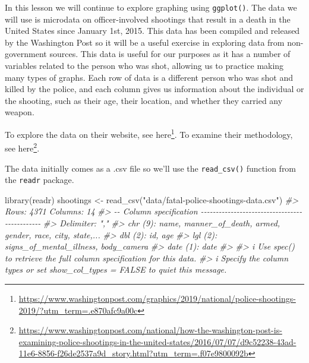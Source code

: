 \documentclass[
]{krantz}
\makeatletter
\newenvironment{Shaded}{\begin{snugshade}}{\end{snugshade}}
\newcommand{\CommentTok}[1]{\textcolor[rgb]{0.37,0.37,0.37}{\textit{#1}}}
\newcommand{\FunctionTok}[1]{\textcolor[rgb]{0,0,0}{#1}}
\newcommand{\NormalTok}[1]{#1}
\newcommand{\OtherTok}[1]{\textcolor[rgb]{0.37,0.37,0.37}{#1}}
\newcommand{\StringTok}[1]{\textcolor[rgb]{0.5,0.5,0.5}{#1}}
\renewcommand{\href}[2]{#2\footnote{\url{#1}}}
\newenvironment{kframe}{%
\medskip{}
\setlength{\fboxsep}{.8em}
 \def\at@end@of@kframe{}%
 \ifinner\ifhmode%
  \def\at@end@of@kframe{\end{minipage}}%
  \begin{minipage}{\columnwidth}%
 \fi\fi%
 \def\FrameCommand##1{\hskip\@totalleftmargin \hskip-\fboxsep
 \colorbox{shadecolor}{##1}\hskip-\fboxsep
     \hskip-\linewidth \hskip-\@totalleftmargin \hskip\columnwidth}%
 \MakeFramed {\advance\hsize-\width
   \@totalleftmargin\z@ \linewidth\hsize
   \@setminipage}}%
 {\par\unskip\endMakeFramed%
 \at@end@of@kframe}
\renewenvironment{Shaded}{\begin{kframe}}{\end{kframe}}
\makeatother
\begin{document}
In this lesson we will continue to explore graphing using \texttt{ggplot()}. The data we will use is microdata on officer-involved shootings that result in a death in the United States since January 1st, 2015. This data has been compiled and released by the Washington Post so it will be a useful exercise in exploring data from non-government sources. This data is useful for our purposes as it has a number of variables related to the person who was shot, allowing us to practice making many types of graphs. Each row of data is a different person who was shot and killed by the police, and each column gives us information about the individual or the shooting, such as their age, their location, and whether they carried any weapon.

To explore the data on their website, see \href{https://www.washingtonpost.com/graphics/2019/national/police-shootings-2019/?utm_term=.e870afc9a00c}{here}.
To examine their methodology, see \href{https://www.washingtonpost.com/national/how-the-washington-post-is-examining-police-shootings-in-the-united-states/2016/07/07/d9c52238-43ad-11e6-8856-f26de2537a9d_story.html?utm_term=.f07e9800092b}{here}.

The data initially comes as a .csv file so we'll use the \texttt{read\_csv()} function from the \texttt{readr} package.

\begin{Shaded}
\begin{Highlighting}[]
\FunctionTok{library}\NormalTok{(readr)}
\NormalTok{shootings }\OtherTok{\textless{}{-}} \FunctionTok{read\_csv}\NormalTok{(}\StringTok{"data/fatal{-}police{-}shootings{-}data.csv"}\NormalTok{)}
\CommentTok{\#\textgreater{} Rows: 4371 Columns: 14}
\CommentTok{\#\textgreater{} {-}{-} Column specification {-}{-}{-}{-}{-}{-}{-}{-}{-}{-}{-}{-}{-}{-}{-}{-}{-}{-}{-}{-}{-}{-}{-}{-}{-}{-}{-}{-}{-}{-}{-}{-}{-}{-}{-}{-}{-}{-}{-}{-}{-}{-}{-}{-}{-}{-}}
\CommentTok{\#\textgreater{} Delimiter: ","}
\CommentTok{\#\textgreater{} chr  (9): name, manner\_of\_death, armed, gender, race, city, state,...}
\CommentTok{\#\textgreater{} dbl  (2): id, age}
\CommentTok{\#\textgreater{} lgl  (2): signs\_of\_mental\_illness, body\_camera}
\CommentTok{\#\textgreater{} date (1): date}
\CommentTok{\#\textgreater{} }
\CommentTok{\#\textgreater{} i Use \textasciigrave{}spec()\textasciigrave{} to retrieve the full column specification for this data.}
\CommentTok{\#\textgreater{} i Specify the column types or set \textasciigrave{}show\_col\_types = FALSE\textasciigrave{} to quiet this message.}
\end{Highlighting}
\end{Shaded}
\end{document}
